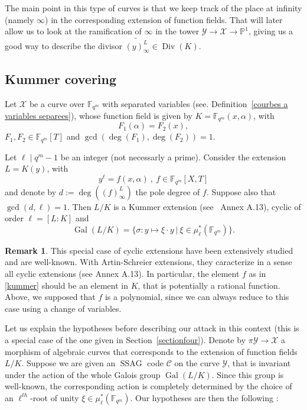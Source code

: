\documentclass[10pt]{article}
\theoremstyle{definition}
\newtheorem{rq1}[thm]{Remark}
\theoremstyle{definition}
\theoremstyle{definition}
\newcommand{\s}{\vspace{0.3cm}}
\newcommand{\cd}{\cdot}
\newcommand{\PP}{\mathbb{P}}
\newcommand{\fqm}{\mathbb{F}_{q^m}}
\newcommand{\X}{\mathcal{X}}
\newcommand{\Y}{\mathcal{Y}}
\newcommand{\Div}{\operatorname{Div}}
\newcommand{\Gal}{\operatorname{Gal}}
\newcommand{\ssag}{\operatorname{SSAG}}
\begin{document}
\s

The main point in this type of curves is that we keep track of the place at infinity (namely $\infty$) in the corresponding extension of function fields. That will later allow us to look at the ramification of $\infty$ in the tower $\Y \longrightarrow \X \longrightarrow \PP^1$, giving us a good way to describe the divisor $\widetilde{(y)_{\infty}^L} \in \Div(K)$.


\s

\subsection{Kummer covering} \label{sectionkummer}

\s

Let $\X$ be a curve over $\fqm$ with separated variables (see. Definition~\ref{courbes a variables separees}), whose function field is given by $K=\fqm(x,\alpha)$, with
\[F_1(\alpha) = F_2(x),\] 
$F_1,F_2 \in \fqm[T]$ and $\gcd(\deg(F_1),\deg(F_2))=1$. 

\s

Let $\ell \mid q^m-1$ be an integer (not necessarly a prime). Consider the extension $L=K(y)$, with
\begin{equation} \label{kummer}
y^{\ell} = f(x,\alpha) \ , \ f \in \fqm[X,T] 
\end{equation}
and denote by \color{purple} $d:=\deg\left((f)^L_{\infty}\right)$ the pole degree of $f$. \color{black}
Suppose also that $\gcd(d,\ell)=1$. Then $L/K$ is a Kummer extension (see~\cite{Sti} Annex A.13), cyclic of order $\ell=[L:K]$ and 
\[\Gal(L/K) = \{ \sigma : y \mapsto \xi \cd y \ | \ \xi \in \mu^*_{\ell}(\fqm)\}.\] 

\s

\begin{rq1} \label{pk des polynomes}
This special case of cyclic extensions have been extensively studied and are well-known. With Artin-Schreier extensions, they caracterize in a sense all cyclic extensions (see \cite{Sti} Annex A.13). In particular, the element $f$ as in \eqref{kummer} should be an element in $K$, that is potentially a rational function. Above, we supposed that $f$ is a polynomial, since we can always reduce to this case using a change of variables.
\end{rq1}

\s

Let us explain the hypotheses before describing our attack in this context (this is a special case of the one given in Section~\ref{sectionfour}). \color{purple} Denote by $\pi \Y \longrightarrow \X$ a morphism of algebraic curves that corresponds to the extension of function fields $L/K$\color{black}. Suppose we are given an $\ssag$ code $\mathcal{C}$ on the curve $\Y$, that is invariant under the action of the whole Galois group $\Gal(L/K)$. Since this group is well-known, the corresponding action is completely determined by the choice of an $\ell^{th}$-root of unity $\xi \in \mu^*_{\ell}(\fqm)$. Our hypotheses are then the following :
\end{document}
